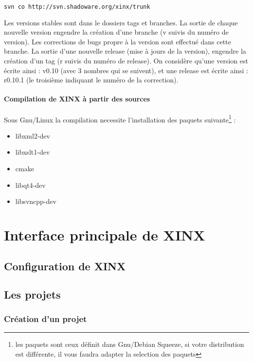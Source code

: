 \documentclass[a4paper,10pt,twoside,titlepage,onecolumn]{book}
\begin{document}
\begin{verbatim} 
svn co http://svn.shadoware.org/xinx/trunk
\end{verbatim}

Les versions stables sont dans le dossiers tags et branches. La sortie de chaque nouvelle version engendre la création d'une branche (v suivis du numéro de version). Les corrections de bugs propre à la version sont effectué dans cette branche. La sortie d'une nouvelle release (mise à jours de la version), engendre la création d'un tag (r suivis du numéro de release). On considère qu'une version est écrite ainsi : v0.10 (avec 3 nombres qui se suivent), et une release est écrite ainsi : r0.10.1 (le troisième indiquant le numéro de la correction).


\subsubsection{Compilation de XINX à partir des sources}

Sous Gnu/Linux la compilation necessite l'installation des paquets suivante\footnote{les paquets sont ceux définit dans Gnu/Debian Squeeze, si votre distribution est différente, il vous faudra adapter la selection des paquets} :
\begin{itemize}
 \item libxml2-dev
 \item libxslt1-dev
 \item cmake
 \item libqt4-dev
 \item libsvncpp-dev 
\end{itemize}


\chapter{Interface principale de XINX}

\section{Configuration de XINX}

\section{Les projets}

\subsection{Création d'un projet}
\end{document}
